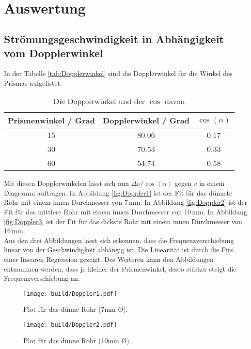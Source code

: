 \section{Auswertung}
\label{sec:Auswertung}

\subsection{Strömungsgeschwindigkeit in Abhängigkeit vom Dopplerwinkel}
\label{sec:asd}
In der Tabelle \eqref{tab:Dopplerwinkel} sind die Dopplerwinkel für die Winkel des Prismas aufgelistet.

\begin{table}[H] %
  \centering
  \begin{tabular}{c|c|c}
    \hline
    Prismenwinkel / Grad & Dopplerwinkel / Grad & $\cos(\alpha)$ \\
    \hline
    15 & 80.06 & 0.17 \\
    30 & 70.53 & 0.33 \\
    60 & 54.74 & 0.58 \\
  \end{tabular}
  \caption{Die Dopplerwinkel und der $\cos$ davon}
  \label{tab:Dopplerwinkel}
\end{table}

Mit diesen Dopplerwinkelen lässt sich nun $\Delta \nu / \cos(\alpha)$ gegen $v$ in einem Diagramm auftragen. In Abbildung \eqref{fig:Doppler1} ist der Fit für das dünnste Rohr mit einem innen Durchmesser von 7\,mm. In Abbildung \eqref{fig:Doppler2} ist der Fit für das mittlere Rohr mit einem innen Durchmesser von 10\,mm. In Abbildung \eqref{fig:Doppler3} ist der Fit für das dickste Rohr mit einem innen Durchmesser von 16\,mm. \\
Aus den drei Abbildungen lässt sich erkennen, dass die Frequenzverschiebung linear von der Geschwindigkeit abhängig ist. Die Linearität ist durch die Fits einer linearen Regression gezeigt. Des Weiteren kann den Abbildungen entnommen werden, dass je kleiner der Prismenwinkel, desto stärker steigt die Frequenzverschiebung an.

\begin{figure}[H]
  \centering
  \texttt{[image: build/Doppler1.pdf]}
  \caption{Plot für das dünne Rohr (7mm \O).}
  \label{fig:Doppler1}
\end{figure}

\begin{figure}[H]
  \centering
  \texttt{[image: build/Doppler2.pdf]}
  \caption{Plot für das dünne Rohr (10mm \O).}
  \label{fig:Doppler2}
\end{figure}

